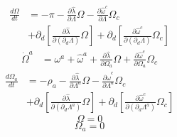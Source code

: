 \documentclass{article}
\begin{document}
\begin{align*}
\frac{ d \Omega}{dt} & = -\pi - \frac{\partial {\hat \lambda}}{\partial \Lambda}\Omega - \frac{\partial {\hat \omega}^{c}}{\partial \Lambda}\Omega_{c}\\
& + \partial_{d}[\frac{\partial {\hat \lambda}}{\partial(\partial_{d}\Lambda)}\Omega] + \partial_{d}[\frac{\partial {\hat \omega^{c}}}{\partial(\partial_{d}\Lambda)}\Omega_{c}] 
\end{align*}
\begin{align*}
{\dot \Omega}^{a} & = \omega^{a} + {\hat \omega^{a}} + \frac{\partial {\hat \lambda}}{\partial \Omega_{a}}\Omega + \frac{\partial {\hat \omega}^{c}}{\partial \Omega_{a}}\Omega_{c}
\end{align*}
\begin{align*}
\frac{d \Omega_{a}}{dt} & = -\rho_{a} -  \frac{\partial {\hat \lambda}}{\partial \Lambda^{a}}\Omega - \frac{\partial {\hat \omega}^{c}}{\partial \Lambda^{a}}\Omega_{c}\\
& + \partial_{d}[\frac{\partial {\hat \lambda}}{\partial(\partial_{d}\Lambda^{a})}\Omega] + \partial_{d}[\frac{\partial {\hat \omega^{c}}}{\partial(\partial_{d}\Lambda^{a})}\Omega_{c}] 
\end{align*}
\[
\Omega  = 0
\]
\[
\Omega_{a} = 0
\]
\end{document}
